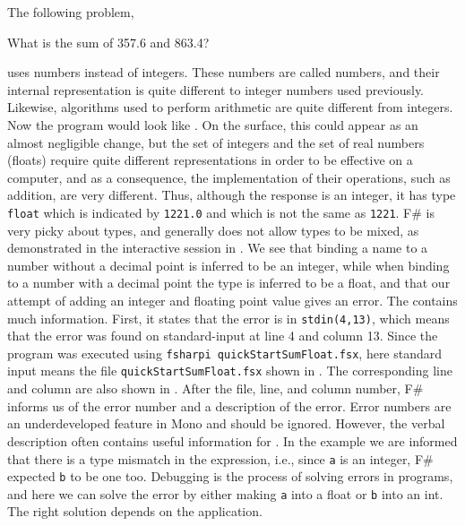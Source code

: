 The following problem,
%
\begin{problem}
  What is the sum of 357.6 and 863.4?
\end{problem}
%
uses  numbers instead of integers. These numbers are called  numbers, and their internal representation is quite different to integer numbers used previously. Likewise, algorithms used to perform arithmetic are quite different from integers. Now the program would look like .
%
%
On the surface, this could appear as an almost negligible change, but the set of integers and the set of real numbers (floats) require quite different representations in order to be effective on a computer, and as a consequence, the implementation of their operations, such as addition, are very different. Thus, although the response is an integer, it has type \lstinline|float| which is indicated by \lstinline|1221.0| and which is not the same as \lstinline|1221|. F\# is very picky about types, and generally does not allow types to be mixed, as demonstrated in the interactive session in .
%
%
We see that binding a name to a number without a decimal point is inferred to be an integer, while when binding to a number with a decimal point the type is inferred to be a float, and that our attempt of adding an integer and floating point value gives an error. The  contains much information. First, it states that the error is in \lstinline[language=console]{stdin(4,13)}, which means that the error was found on standard-input at line 4 and column 13. Since the program was executed using \lstinline[language=console]{fsharpi quickStartSumFloat.fsx}, here standard input means the file \lstinline[language=console]{quickStartSumFloat.fsx} shown in . The corresponding line and column are also shown in . After the file, line, and column number, F\# informs us of the error number and a description of the error. Error numbers are an underdeveloped feature in Mono and should be ignored. However, the verbal description often contains useful information for . In the example we are informed that there is a type mismatch in the expression, i.e., since \lstinline{a} is an integer, F\# expected \lstinline{b} to be one too. Debugging is the process of solving errors in programs, and here we can solve the error by either making \lstinline{a} into a float or \lstinline{b} into an int. The right solution depends on the application.

